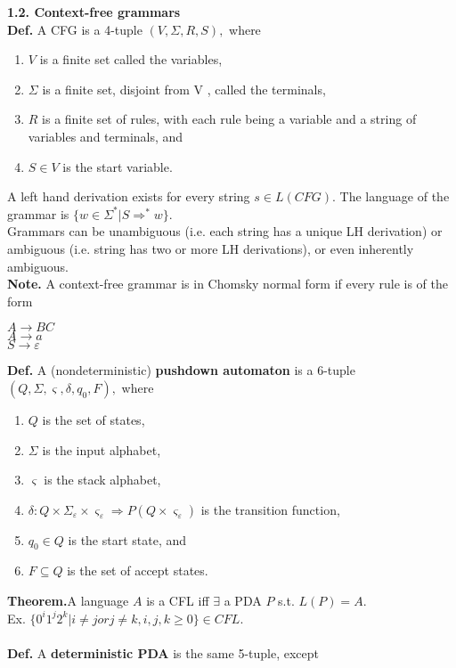\documentclass[12pt]{article}
\begin{document}
\begin{multicols}{2}
\textbf{1.2. Context-free grammars}\\
\textbf{Def.} A CFG is a 4-tuple $(V, \Sigma, R, S),$ where
\begin{enumerate}
\itemsep-0.5em
\item $V$ is a finite set called the variables,
\item $\Sigma$ is a finite set, disjoint from V , called the terminals,
\item $R$ is a finite set of rules, with each rule being a variable and a
string of variables and terminals, and
\item $S \in V$ is the start variable.
\end{enumerate}
A left hand derivation exists for every string $s \in L(CFG).$ The language of the grammar is $\lbrace w \in \Sigma^{*} | S \Rightarrow^{*} w \rbrace.$\\
Grammars can be unambiguous (i.e. each string has a unique LH derivation) or ambiguous (i.e. string has two or more LH derivations), or even inherently ambiguous.\\
\textbf{Note.} A context-free grammar is in Chomsky normal form if every rule is of the form
\begin{center}
$A \rightarrow BC$\\
$A \rightarrow a$\\
$S \rightarrow \varepsilon$
\end{center}
\textbf{Def.} A (nondeterministic) \textbf{pushdown automaton} is a 6-tuple $(Q, \Sigma, \varsigma, \delta, q_{0}, F),$ where
\begin{enumerate}
\item $Q$ is the set of states,
\item $\Sigma$ is the input alphabet,
\item $\varsigma$ is the stack alphabet,
\item $\delta : Q \times \Sigma_{\varepsilon} \times \varsigma_{\varepsilon} \Rightarrow P(Q \times \varsigma_{\varepsilon})$ is the transition function,
\item $q_{0} \in Q$ is the start state, and
\item $F \subseteq Q$ is the set of accept states.
\end{enumerate}
\textbf{Theorem.}A language $A$ is a CFL iff $\exists$ a PDA $P$ s.t. $L(P) = A.$\\
Ex. $\lbrace 0^{i}1^{j}2^{k} | i \neq j or j \neq k, i,j,k \geq 0 \rbrace \in CFL.$\\\\
\textbf{Def.} A \textbf{deterministic PDA} is the same 5-tuple, except

\end{multicols}
\end{document}
